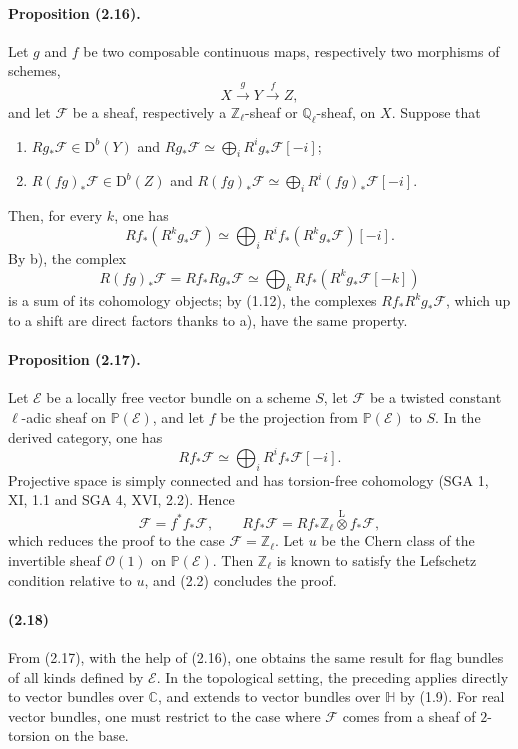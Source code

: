 \documentclass[10pt]{article}
\providecommand{\C}{\mathbb C}
\providecommand{\Ql}{\mathbb Q_\ell}
\providecommand{\Zl}{\mathbb Z_\ell}
\providecommand{\D}{\mathrm D}
\begin{document}
\paragraph{Proposition (2.16).} Let $g$ and $f$ be two composable continuous maps, respectively two morphisms of schemes,
\[
X\xrightarrow{g}Y\xrightarrow{f}Z,
\]
and let $\mathcal F$ be a sheaf, respectively a $\Zl$-sheaf or $\Ql$-sheaf, on $X$. Suppose that
\begin{enumerate}[label=\alph*)]
\item $Rg_*\mathcal F\in\D^b(Y)$ and $Rg_*\mathcal F\simeq\bigoplus_iR^ig_*\mathcal F[-i]$;
\item $R(fg)_*\mathcal F\in\D^b(Z)$ and $R(fg)_*\mathcal F\simeq\bigoplus_iR^i(fg)_*\mathcal F[-i]$.
\end{enumerate}
Then, for every $k$, one has
\[
Rf_*(R^kg_*\mathcal F)\simeq\bigoplus_i R^if_*(R^kg_*\mathcal F)[-i].
\]
By b), the complex
\[
R(fg)_*\mathcal F=Rf_*Rg_*\mathcal F\simeq
\bigoplus_kRf_*(R^kg_*\mathcal F[-k])
\]
is a sum of its cohomology objects; by (1.12), the complexes $Rf_*R^kg_*\mathcal F$, which up to a shift are direct factors thanks to a), have the same property.

\paragraph{Proposition (2.17).} Let $\mathcal E$ be a locally free vector bundle on a scheme $S$, let $\mathcal F$ be a twisted constant $\ell$-adic sheaf on $\mathbb P(\mathcal E)$, and let $f$ be the projection from $\mathbb P(\mathcal E)$ to $S$. In the derived category, one has
\[
Rf_*\mathcal F\simeq\bigoplus_iR^if_*\mathcal F[-i].
\]
Projective space is simply connected and has torsion-free cohomology (SGA 1, XI, 1.1 and SGA 4, XVI, 2.2). Hence
\[
\mathcal F=f^*f_*\mathcal F,
\qquad
Rf_*\mathcal F=Rf_*\Zl\overset{\mathrm L}{\otimes} f_*\mathcal F,
\]
which reduces the proof to the case $\mathcal F=\Zl$. Let $u$ be the Chern class of the invertible sheaf $\mathcal O(1)$ on $\mathbb P(\mathcal E)$. Then $\Zl$ is known to satisfy the Lefschetz condition relative to $u$, and (2.2) concludes the proof.

\paragraph{(2.18)} From (2.17), with the help of (2.16), one obtains the same result for flag bundles of all kinds defined by $\mathcal E$. In the topological setting, the preceding applies directly to vector bundles over $\C$, and extends to vector bundles over $\mathbb H$ by (1.9). For real vector bundles, one must restrict to the case where $\mathcal F$ comes from a sheaf of $2$-torsion on the base.
\end{document}
